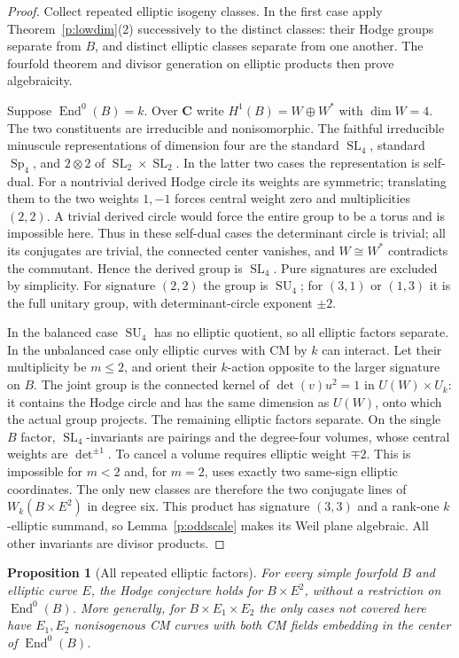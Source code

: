 \documentclass[11pt,reqno]{article}
\theoremstyle{emphasizedplain}
\newtheorem{proposition}[theorem]{Proposition}
\theoremstyle{emphasizeddefinition}
\theoremstyle{emphasizeddefinition}
\DeclareMathOperator{\End}{End}
\DeclareMathOperator{\Sp}{Sp}
\DeclareMathOperator{\SL}{SL}
\DeclareMathOperator{\SU}{SU}
\newcommand{\C}{\mathbf C}
\begin{document}
\begin{proof}
Collect repeated elliptic isogeny classes. In the first case apply
Theorem~\ref{p:lowdim}(2) successively to the distinct classes: their
Hodge groups separate from $B$, and distinct elliptic classes separate
from one another. The fourfold theorem and divisor generation on
elliptic products then prove algebraicity.

Suppose $\End^0(B)=k$. Over $\C$ write $H^1(B)=W\oplus W^*$ with
$\dim W=4$. The two constituents are irreducible and nonisomorphic.
The faithful irreducible minuscule representations of dimension four
are the standard $\SL_4$, standard $\Sp_4$, and $2\otimes2$ of
$\SL_2\times\SL_2$. In the latter two cases the representation is
self-dual. For a nontrivial derived Hodge circle its weights are
symmetric; translating them to the two weights $1,-1$ forces central
weight zero and multiplicities $(2,2)$. A trivial derived circle would
force the entire group to be a torus and is impossible here.
Thus in these self-dual cases the determinant circle is trivial; all
its conjugates are trivial, the connected center vanishes, and
$W\cong W^*$ contradicts the commutant. Hence the derived group is
$\SL_4$. Pure signatures are excluded by simplicity.
For signature $(2,2)$ the group is $\SU_4$; for $(3,1)$ or $(1,3)$ it
is the full unitary group, with determinant-circle exponent $\pm2$.

In the balanced case $\SU_4$ has no elliptic quotient, so all elliptic
factors separate. In the unbalanced case only elliptic curves with CM
by $k$ can interact. Let their multiplicity be $m\leq2$, and orient
their $k$-action opposite to the larger signature on $B$. The joint
group is the connected kernel of $\det(v)u^2=1$ in $U(W)\times U_k$:
it contains the Hodge circle and has the same dimension as $U(W)$,
onto which the actual group projects. The remaining elliptic factors
separate. On the single $B$ factor, $\SL_4$-invariants are pairings and
the degree-four volumes, whose central weights are $\det^{\pm1}$.
To cancel a volume requires elliptic weight $\mp2$. This is impossible
for $m<2$ and, for $m=2$, uses exactly two same-sign elliptic coordinates.
The only new classes are therefore the two conjugate lines of
$W_k(B\times E^2)$ in degree six. This product has signature $(3,3)$
and a rank-one $k$-elliptic summand, so Lemma~\ref{p:oddscale} makes
its Weil plane algebraic. All other invariants are divisor products.
\end{proof}
\begin{proposition}[All repeated elliptic factors]\label{p:N3repeated}
For every simple fourfold $B$ and elliptic curve $E$, the Hodge
conjecture holds for $B\times E^2$, without a restriction on
$\End^0(B)$. More generally, for $B\times E_1\times E_2$ the
only cases not covered here have $E_1,E_2$ nonisogenous CM curves
with both CM fields embedding in the center of $\End^0(B)$.
\end{proposition}
\end{document}
